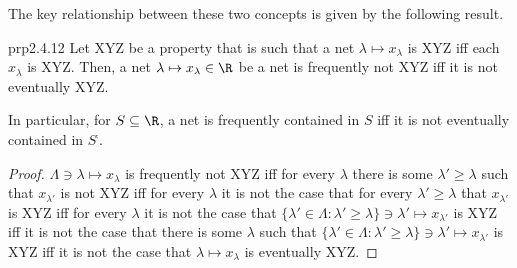 The key relationship between these two concepts is given by the following result.
\begin{mpr}{}{prp2.4.12}
Let XYZ be a property that is such that a net $\lambda \mapsto x_{\lambda}$ is XYZ iff each $x_{\lambda}$ is XYZ.  Then, a net $\lambda \mapsto x_{\lambda}\in \R$ be a net is frequently not XYZ iff it is not eventually XYZ.
\begin{rmk}
In particular, for $S\subseteq \R$, a net is frequently contained in $S$ iff it is not eventually contained in $S^{\comp}$.
\end{rmk}
\begin{proof}
$\Lambda \ni \lambda \mapsto x_{\lambda}$ is frequently not XYZ iff for every $\lambda$ there is some $\lambda '\geq \lambda$ such that $x_{\lambda '}$ is not XYZ iff for every $\lambda$ it is not the case that for every $\lambda '\geq \lambda$ that $x_{\lambda '}$ is XYZ iff for every $\lambda$ it is not the case that $\{ \lambda '\in \Lambda :\lambda '\geq \lambda \} \ni \lambda '\mapsto x_{\lambda '}$ is XYZ iff it is not the case that there is some $\lambda$ such that $\{ \lambda '\in \Lambda :\lambda '\geq \lambda \} \ni \lambda '\mapsto x_{\lambda '}$ is XYZ iff it is not the case that $\lambda \mapsto x_{\lambda}$ is eventually XYZ.
\end{proof}
\end{mpr}

\horizontalrule

